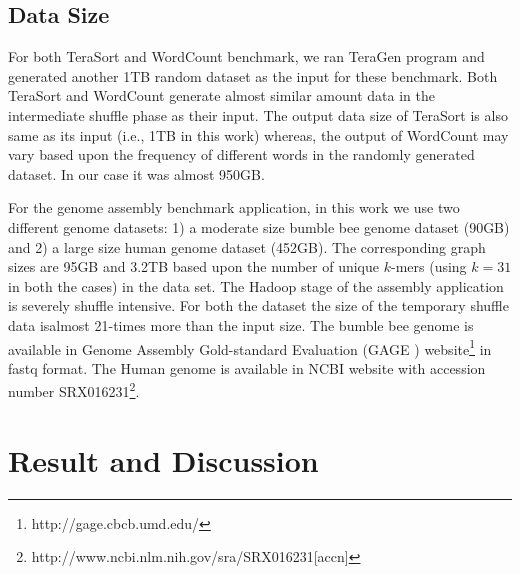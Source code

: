 \documentclass[journal]{IEEEtran}
\begin{document}
\subsection{Data Size}
For both TeraSort and WordCount benchmark, we ran TeraGen program and generated another 1TB random dataset as the input for these benchmark. Both TeraSort and WordCount generate almost similar amount data in the intermediate shuffle phase as their input. The output data size of TeraSort is also same as its input (i.e., 1TB in this work) whereas, the output of WordCount may vary based upon the frequency of different words in the randomly generated dataset. In our case it was almost 950GB.

For the genome assembly benchmark application, in this work we use two different genome datasets: 1) a moderate size bumble bee genome dataset (90GB) and 2) a large size human genome dataset (452GB). The corresponding graph sizes are 95GB and 3.2TB based upon the number of unique $k$-mers (using $k=31$ in both the cases) in the data set. The Hadoop stage of the assembly application is severely shuffle intensive. For both the dataset the size of the temporary shuffle data isalmost 21-times more than the input size. The bumble bee genome is available in Genome Assembly Gold-standard Evaluation (GAGE \cite{bio:gage}) website\footnote{http://gage.cbcb.umd.edu/} in fastq format. The Human genome is available in NCBI website with accession number SRX016231\footnote{http://www.ncbi.nlm.nih.gov/sra/SRX016231[accn]}.

\section{Result and Discussion}
\end{document}
